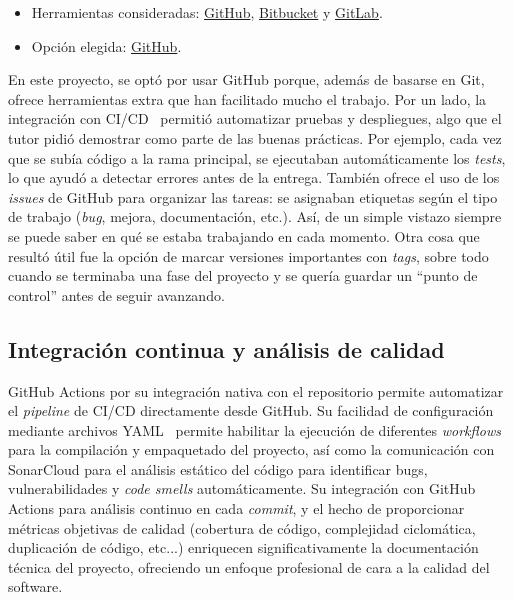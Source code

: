 \begin{itemize}
\tightlist
\item
  Herramientas consideradas: \href{https://github.com/}{GitHub},
  \href{https://bitbucket.org/}{Bitbucket} y
  \href{https://gitlab.com/}{GitLab}.
\item
  Opción elegida: \href{https://github.com/}{GitHub}.
\end{itemize}

En este proyecto, se optó por usar GitHub porque, además de basarse en Git, ofrece herramientas extra que han facilitado mucho el trabajo. Por un lado, la integración con CI/CD~\cite{ci-cd} permitió automatizar pruebas y despliegues, algo que el tutor pidió demostrar como parte de las buenas prácticas. Por ejemplo, cada vez que se subía código a la rama principal, se ejecutaban automáticamente los \emph{tests}, lo que ayudó a detectar errores antes de la entrega. También ofrece el uso de los \emph{issues} de GitHub para organizar las tareas: se asignaban etiquetas según el tipo de trabajo (\emph{bug}, mejora, documentación, etc.). Así, de un simple vistazo siempre se puede saber en qué se estaba trabajando en cada momento. Otra cosa que resultó útil fue la opción de marcar versiones importantes con \emph{tags}, sobre todo cuando se terminaba una fase del proyecto y se quería guardar un ``punto de control'' antes de seguir avanzando.

\subsection{Integración continua y análisis de calidad}\label{integracion-continua-analisis-calidad}
GitHub Actions por su integración nativa con el repositorio permite automatizar el \emph{pipeline} de CI/CD directamente desde GitHub. Su facilidad de configuración mediante archivos YAML~\cite{yaml} permite habilitar la ejecución de diferentes \emph{workflows} para la compilación y empaquetado del proyecto, así como la comunicación con SonarCloud para el análisis estático del código para identificar bugs, vulnerabilidades y \emph{code smells} automáticamente. Su integración con GitHub Actions para análisis continuo en cada \emph{commit}, y el hecho de proporcionar métricas objetivas de calidad (cobertura de código, complejidad ciclomática, duplicación de código, etc...) enriquecen significativamente la documentación técnica del proyecto, ofreciendo un enfoque profesional de cara a la calidad del software.

